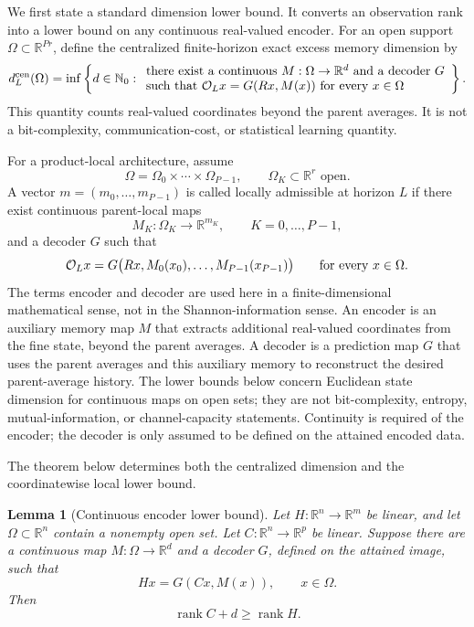 \documentclass[pdflatex,sn-mathphys-num]{sn-jnl}%
\newtheorem{lemma}{Lemma}
\DeclareMathOperator{\rank}{rank}
\theoremstyle{thmstyleone}%
\theoremstyle{thmstyletwo}%
\theoremstyle{thmstylethree}%
\begin{document}
We first state a standard dimension lower bound.  It converts an observation
rank into a lower bound on any continuous real-valued encoder. For an open support \(\Omega\subset\mathbb R^{Pr}\), define the centralized
finite-horizon exact excess memory dimension by
\[
  d^{\rm cen}_L(\Omega)
  =
  \inf
  \left\{
   d\in\mathbb N_0:
  \begin{array}{l}
  \text{there exist a continuous }M:\Omega\to\mathbb R^d
  \text{ and a decoder }G\\
  \text{such that }
  {\cal O}_Lx=G(Rx,M(x))\text{ for every }x\in\Omega
  \end{array}
  \right\}.
\]
This quantity counts real-valued coordinates beyond the parent averages.  It
is not a bit-complexity, communication-cost, or statistical learning
quantity.

For a product-local architecture, assume
\[
  \Omega=\Omega_0\times\cdots\times\Omega_{P-1},
  \qquad
  \Omega_K\subset\mathbb R^r\text{ open}.
\]
A vector \(m=(m_0,\ldots,m_{P-1})\) is called locally admissible at horizon
\(L\) if there exist continuous parent-local maps
\[
  M_K:\Omega_K\to\mathbb R^{m_K},
  \qquad K=0,\ldots,P-1,
\]
and a decoder \(G\) such that
\[
  {\cal O}_Lx
  =
  G\bigl(Rx,M_0(x_0),\ldots,M_{P-1}(x_{P-1})\bigr)
  \qquad
  \text{for every }x\in\Omega.
\]
The terms encoder and decoder are used here in a finite-dimensional
mathematical sense, not in the Shannon-information sense.  An encoder is an
auxiliary memory map \(M\) that extracts additional real-valued coordinates
from the fine state, beyond the parent averages.  A decoder is a prediction
map \(G\) that uses the parent averages and this auxiliary memory to
reconstruct the desired parent-average history.  The lower bounds below
concern Euclidean state dimension for continuous maps on open sets; they are
not bit-complexity, entropy, mutual-information, or channel-capacity
statements.  Continuity is required of the encoder; the decoder is only
assumed to be defined on the attained encoded data.

The theorem below determines both the centralized dimension and the
coordinatewise local lower bound.

\begin{lemma}[Continuous encoder lower bound]
\label{lem:encoder}
Let \(H:\mathbb R^n\to\mathbb R^m\) be linear, and let
\(\Omega\subset\mathbb R^n\) contain a nonempty open set.  Let
\(C:\mathbb R^n\to\mathbb R^p\) be linear.  Suppose there are a continuous
map \(M:\Omega\to\mathbb R^d\) and a decoder \(G\), defined on the attained
image, such that
\[
  Hx=G(Cx,M(x)),
  \qquad x\in\Omega.
\]
Then
\[
  \rank C+d\ge \rank H.
\]
\end{lemma}
\end{document}
